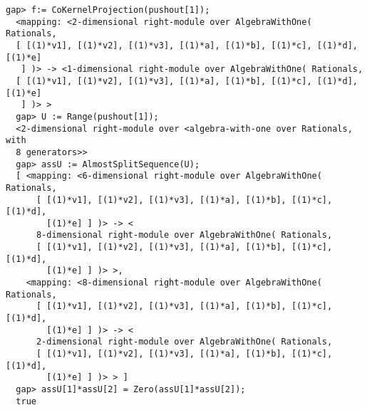 \documentclass[a4paper,11pt]{report}
\begin{document}
{{\begin{Verbatim}[fontsize=\small,frame=single,label=Example]
  gap> f:= CoKernelProjection(pushout[1]);
  <mapping: <2-dimensional right-module over AlgebraWithOne( Rationals, 
  [ [(1)*v1], [(1)*v2], [(1)*v3], [(1)*a], [(1)*b], [(1)*c], [(1)*d], [(1)*e] 
   ] )> -> <1-dimensional right-module over AlgebraWithOne( Rationals, 
  [ [(1)*v1], [(1)*v2], [(1)*v3], [(1)*a], [(1)*b], [(1)*c], [(1)*d], [(1)*e] 
   ] )> >
  gap> U := Range(pushout[1]);            
  <2-dimensional right-module over <algebra-with-one over Rationals, with 
  8 generators>>
  gap> assU := AlmostSplitSequence(U);
  [ <mapping: <6-dimensional right-module over AlgebraWithOne( Rationals, 
      [ [(1)*v1], [(1)*v2], [(1)*v3], [(1)*a], [(1)*b], [(1)*c], [(1)*d], 
        [(1)*e] ] )> -> <
      8-dimensional right-module over AlgebraWithOne( Rationals, 
      [ [(1)*v1], [(1)*v2], [(1)*v3], [(1)*a], [(1)*b], [(1)*c], [(1)*d], 
        [(1)*e] ] )> >, 
    <mapping: <8-dimensional right-module over AlgebraWithOne( Rationals, 
      [ [(1)*v1], [(1)*v2], [(1)*v3], [(1)*a], [(1)*b], [(1)*c], [(1)*d], 
        [(1)*e] ] )> -> <
      2-dimensional right-module over AlgebraWithOne( Rationals, 
      [ [(1)*v1], [(1)*v2], [(1)*v3], [(1)*a], [(1)*b], [(1)*c], [(1)*d], 
        [(1)*e] ] )> > ]
  gap> assU[1]*assU[2] = Zero(assU[1]*assU[2]);
  true
\end{Verbatim}
 }

 }

 
\end{document}
